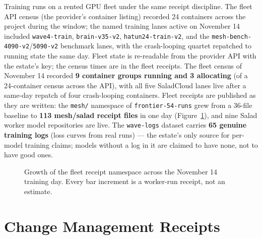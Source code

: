 ﻿\documentclass[11pt]{article}
\begin{document}
Training runs on a rented GPU fleet under the same receipt discipline. The fleet API census (the provider's container listing) recorded 24 containers across the project during the window; the named training lanes active on November 14 included \texttt{wave4-train}, \texttt{brain-v35-v2}, \texttt{hatun24-train-v2}, and the \texttt{mesh-bench-4090-v2}/\texttt{5090-v2} benchmark lanes, with the crash-looping quartet repatched to running state the same day. Fleet state is re-readable from the provider API with the estate's key; the census times are in the fleet receipts. The fleet census of November 14 recorded \textbf{9 container groups running and 3 allocating} (of a 24-container census across the API), with all five SaladCloud lanes live after a same-day repatch of four crash-looping containers. Fleet receipts are published as they are written: the \texttt{mesh/} namespace of \texttt{frontier-54-runs} grew from a 36-file baseline to \textbf{113 mesh/salad receipt files} in one day (Figure~\ref{fig:fleetreceipts}), and nine Salad worker model repositories are live. The \texttt{wave-logs} dataset carries \textbf{65 genuine training logs} (loss curves from real runs) --- the estate's only source for per-model training claims; models without a log in it are claimed to have none, not to have good ones.

\begin{figure}[htbp]
\centering
{}
\caption{Growth of the fleet receipt namespace across the November 14 training day. Every bar increment is a worker-run receipt, not an estimate.}
\label{fig:fleetreceipts}
\end{figure}

\section{Change Management Receipts}
\label{sec:change}
\end{document}
